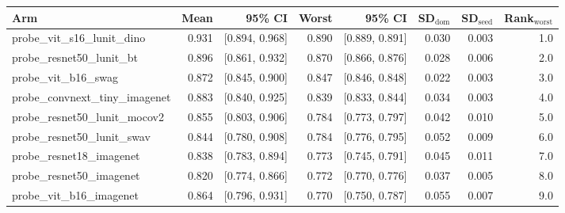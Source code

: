 \begin{tabular}{lrrrrrrr}
\toprule
Arm & Mean & 95\% CI & Worst & 95\% CI & SD$_\text{dom}$ & SD$_\text{seed}$ & Rank$_\text{worst}$ \\
\midrule
probe\_vit\_s16\_lunit\_dino & 0.931 & [0.894, 0.968] & 0.890 & [0.889, 0.891] & 0.030 & 0.003 & 1.0 \\
probe\_resnet50\_lunit\_bt & 0.896 & [0.861, 0.932] & 0.870 & [0.866, 0.876] & 0.028 & 0.006 & 2.0 \\
probe\_vit\_b16\_swag & 0.872 & [0.845, 0.900] & 0.847 & [0.846, 0.848] & 0.022 & 0.003 & 3.0 \\
probe\_convnext\_tiny\_imagenet & 0.883 & [0.840, 0.925] & 0.839 & [0.833, 0.844] & 0.034 & 0.003 & 4.0 \\
probe\_resnet50\_lunit\_mocov2 & 0.855 & [0.803, 0.906] & 0.784 & [0.773, 0.797] & 0.042 & 0.010 & 5.0 \\
probe\_resnet50\_lunit\_swav & 0.844 & [0.780, 0.908] & 0.784 & [0.776, 0.795] & 0.052 & 0.009 & 6.0 \\
probe\_resnet18\_imagenet & 0.838 & [0.783, 0.894] & 0.773 & [0.745, 0.791] & 0.045 & 0.011 & 7.0 \\
probe\_resnet50\_imagenet & 0.820 & [0.774, 0.866] & 0.772 & [0.770, 0.776] & 0.037 & 0.005 & 8.0 \\
probe\_vit\_b16\_imagenet & 0.864 & [0.796, 0.931] & 0.770 & [0.750, 0.787] & 0.055 & 0.007 & 9.0 \\
\bottomrule
\end{tabular}
